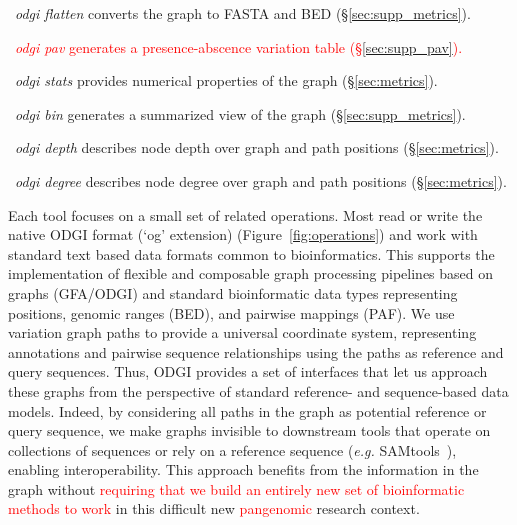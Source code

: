 \documentclass{bioinfo}
\newcommand{\REVIEWED}[1]{{\textcolor{Red}{#1}}}
\begin{document}
\begin{itemize}
\item~\textit{odgi flatten} converts the graph to FASTA and BED (\S\ref{sec:supp_metrics}).
\REVIEWED{\item~\textit{odgi pav} generates a presence-abscence variation table (\S\ref{sec:supp_pav}).}
\item~\textit{odgi stats} provides numerical properties of the graph (\S\ref{sec:metrics}).
\item~\textit{odgi bin} generates a summarized view of the graph (\S\ref{sec:supp_metrics}).
\item~\textit{odgi depth} describes node depth over graph and path positions (\S\ref{sec:metrics}).
\item~\textit{odgi degree} describes node degree over graph and path positions (\S\ref{sec:metrics}).
\end{itemize}

Each tool focuses on a small set of related operations.
Most read or write the native ODGI format (`og' extension) (Figure~\ref{fig:operations}) and work with standard text based data formats common to bioinformatics.
This supports the implementation of flexible and composable graph processing pipelines based on graphs (GFA/ODGI) and standard bioinformatic data types representing positions, genomic ranges (BED), and pairwise mappings (PAF).
We use variation graph paths to provide a universal coordinate system, representing annotations and pairwise sequence relationships using the paths as reference and query sequences.
Thus, ODGI provides a set of interfaces that let us approach these graphs from the perspective of standard reference- and sequence-based data models.
Indeed, by considering all paths in the graph as potential reference or query sequence, we make graphs invisible to downstream tools that operate on collections of sequences or rely on a reference sequence (\textit{e.g.} SAMtools~\citep{Li2009}), enabling interoperability.
This approach benefits from the information in the graph without \REVIEWED{requiring that we build an entirely new set of bioinformatic methods to work} in this difficult new \REVIEWED{pangenomic} research context.
\end{document}
